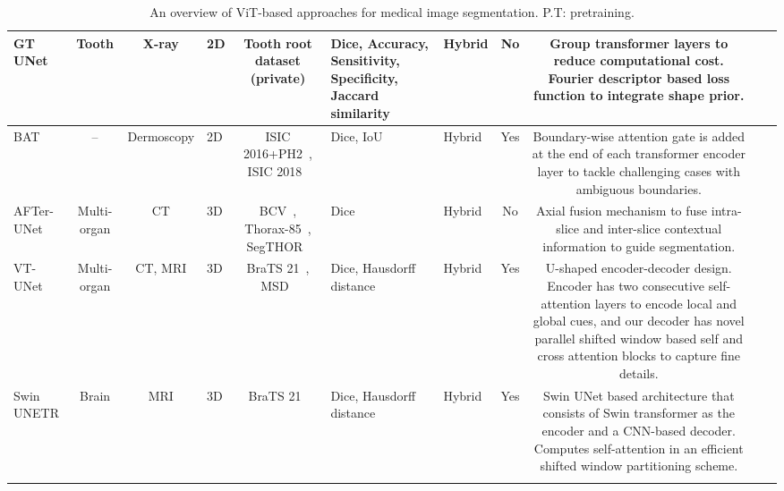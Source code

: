 \begin{table}[]
{\begin{adjustbox}{max width=1.2\textwidth}
\begin{tabular}{V{3}c|c|p{2.2cm}|c|p{3.5cm}|p{3cm}|c|c|p{11.5cm}V{3}}
GT UNet\cite{li2021gt}         & Tooth          & X-ray                    & 2D            & Tooth root dataset (private)                                                           & Dice, Accuracy, Sensitivity, Specificity, Jaccard similarity & Hybrid                & No   & Group transformer layers to reduce computational cost. Fourier descriptor based loss function to integrate shape prior.                                                                                \\ \hline
BAT\cite{wang2021boundary}             & --             & Dermoscopy               & 2D            & ISIC 2016+PH2~\cite{gutman2016skin}, ISIC 2018~\cite{codella2019skin}                                                           & Dice, IoU                                                    & Hybrid                & Yes  & Boundary-wise attention gate is added at the end of each transformer encoder layer to tackle challenging cases with ambiguous boundaries.                                                              \\ \hline
AFTer-UNet\cite{yan2021after}      & Multi-organ    & CT                       & 3D            & BCV~\cite{simpson2019large}, Thorax-85~\cite{chen2021deep}, SegTHOR~\cite{lambert2020segthor}                                                            & Dice                                                         & Hybrid                & No   & Axial fusion mechanism to fuse intra-slice and inter-slice contextual information to guide segmentation.                                                                                              \\ \hline
VT-UNet\cite{peiris2021volumetric}      & Multi-organ & CT, MRI                       & 3D            & BraTS 21~\cite{baid2021rsna}, MSD~\cite{simpson2019large}                                                            & Dice, Hausdorff distance                                                         & Hybrid                & Yes   & U-shaped encoder-decoder design. Encoder has two consecutive self-attention layers to encode local and global cues, and our decoder has novel parallel shifted window based self and cross attention blocks to capture fine details.  \\ \hline
Swin UNETR\cite{hatamizadeh2022swin}      & Brain & MRI                       & 3D            & BraTS 21~\cite{baid2021rsna}                                                            & Dice, Hausdorff distance                                                         & Hybrid                & Yes   & Swin UNet based architecture that consists of Swin transformer as the encoder and a CNN-based decoder. Computes self-attention in an efficient shifted window partitioning scheme.                                                         \\ 
\end{tabular}%
\end{adjustbox}
}
\caption{An overview of ViT-based approaches for medical image segmentation. P.T: pretraining.}
\label{tab:seg_taxonomy}
\end{table}
